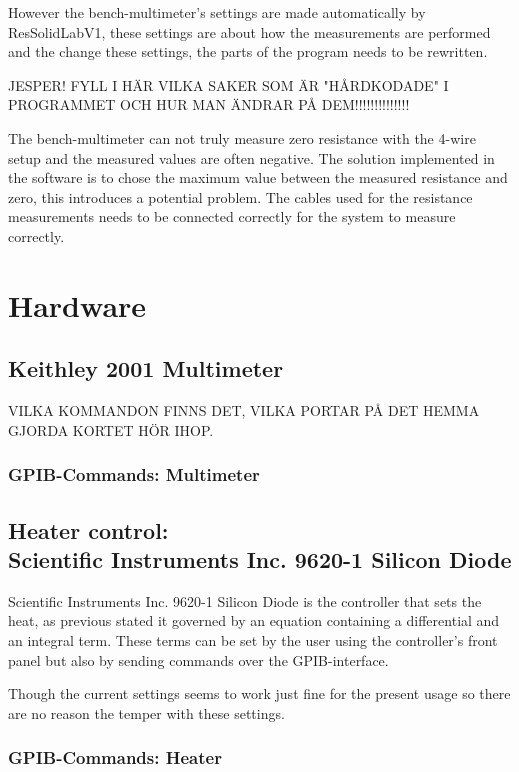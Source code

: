 \documentclass[a4paper,12pt]{article}
\begin{document}
However the bench-multimeter's settings are made automatically by ResSolidLabV1, these settings are about how the measurements are performed and the change these settings, the parts of the program needs to be rewritten.

JESPER! FYLL I HÄR VILKA SAKER SOM ÄR "HÅRDKODADE" I PROGRAMMET OCH HUR MAN ÄNDRAR PÅ DEM!!!!!!!!!!!!!!

The  bench-multimeter can not truly measure zero resistance with the 4-wire setup and the measured values are often negative. The solution implemented in the software is to chose the maximum value between the measured resistance and zero, this introduces a potential
problem. The cables used for the resistance measurements needs to be connected correctly for the system to measure correctly.


\section{Hardware}

\subsection{Keithley 2001 Multimeter}

VILKA KOMMANDON FINNS DET, VILKA PORTAR PÅ DET HEMMA GJORDA KORTET HÖR IHOP.

\subsubsection{GPIB-Commands: Multimeter}

\subsection{Heater control: \\ Scientific Instruments Inc. 9620-1 Silicon Diode}
Scientific Instruments Inc. 9620-1 Silicon Diode is the controller that sets the heat, as previous stated it governed by an equation containing a differential and an integral term. These terms can be set by the user using the controller's front panel but also by sending commands over the GPIB-interface.

Though the current settings seems to work just fine for the present usage so there are no reason the temper with these settings.

\subsubsection{GPIB-Commands: Heater}
\end{document}
